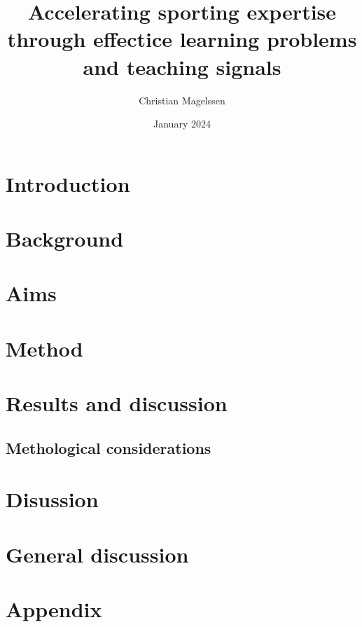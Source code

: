 \documentclass{report}
\title{Accelerating sporting expertise through effectice learning problems and teaching signals}
\author{Christian Magelssen}
\date{January 2024}
\begin{document}
\maketitle

\listoffigures

\chapter{Introduction}


\chapter{Background}


\chapter{Aims}



\chapter{Method}



\chapter{Results and discussion}



\section{Methological considerations}


\chapter{Disussion}




\chapter{General discussion}


\chapter{Appendix}


\printbibliography
\end{document}
